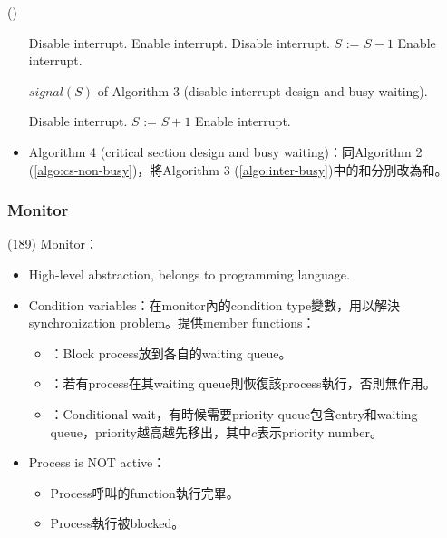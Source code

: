 \begin{theorem}{()}
\begin{itemize}
\begin{algorithm}[H]
            \begin{algorithmic}[1]
                    \State Disable interrupt.
                        \State Enable interrupt.
                        \State Disable interrupt.
                    \EndWhile
                    \State $S$ := $S - 1$ 
                    \State Enable interrupt.
                \EndFunction
            \end{algorithmic}
        \end{algorithm}
        \begin{algorithm}[H]
            \caption{$signal(S)$ of Algorithm 3 (disable interrupt design and busy waiting).}
            \begin{algorithmic}[1]
                    \State Disable interrupt.
                    \State $S$ := $S + 1$
                    \State Enable interrupt.
                \EndFunction
            \end{algorithmic}
        \end{algorithm}
        \item Algorithm 4 (critical section design and busy waiting)：同Algorithm 2 (\ref{algo:cs-non-busy})，將Algorithm 3 (\ref{algo:inter-busy})中的和分別改為和。
    \end{itemize}
\end{theorem}

\subsubsection{Monitor}

\begin{theorem}{(189)} Monitor：\begin{itemize}
        \item High-level abstraction, belongs to programming language.
        \item Condition variables：在monitor內的condition type變數，用以解決synchronization problem。提供member functions：\begin{itemize}
            \item {}：Block process放到各自的waiting queue。
            \item {}：若有process在其waiting queue則恢復該process執行，否則無作用。
            \item {}：Conditional wait，有時候需要priority queue包含entry和waiting queue，priority越高越先移出，其中$c$表示priority number。
        \end{itemize}
        \item Process is NOT active：\begin{itemize}
            \item Process呼叫的function執行完畢。
            \item Process執行被blocked。
        \end{itemize}
    \end{itemize}
\end{theorem}

